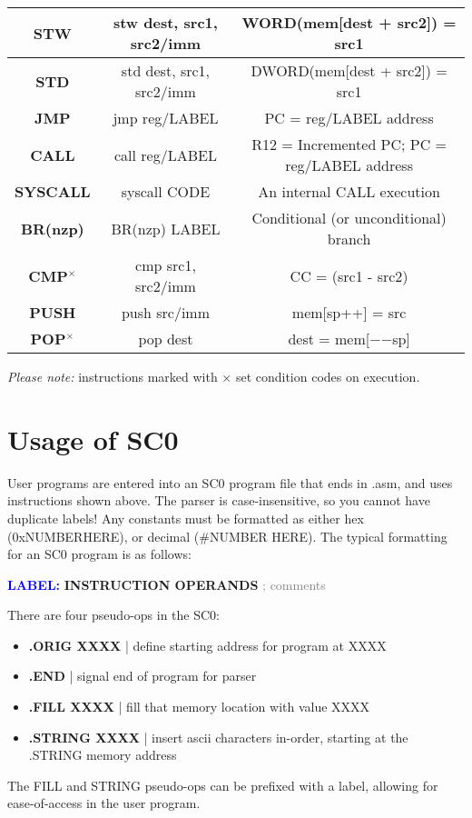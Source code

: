 \documentclass{article}
\newcommand*\scc[1]{{#1}\textbf{$^\times$}}
\begin{document}
\begin{tableofcontents}
\begin{center}
\begin{tabular}{|c|c|c|}
\hline
\textbf{STW} & stw dest, src1, src2/imm & WORD(mem[dest + src2]) = src1 \\
\hline
\textbf{STD} & std dest, src1, src2/imm & DWORD(mem[dest + src2]) = src1 \\
\hline
\textbf{JMP} & jmp reg/LABEL & PC = reg/LABEL address \\
\hline
\textbf{CALL} & call reg/LABEL & R12 = Incremented PC; PC = reg/LABEL address \\
\hline
\textbf{SYSCALL} & syscall CODE & An internal CALL execution \\
\hline
\textbf{BR(nzp)} & BR(nzp) LABEL & Conditional (or unconditional) branch \\
\hline
\textbf{\scc{CMP}} & cmp src1, src2/imm & CC = (src1 - src2) \\
\hline
\textbf{PUSH} & push src/imm & mem[sp++] = src \\
\hline
\textbf{\scc{POP}} & pop dest & dest = mem[$-$$-$sp] \\
\hline
\end{tabular}
\end{center}
\textit{\Large Please note:} instructions marked with $\times$ set condition codes on execution.
\section{\Huge Usage of SC0}
\begin{Large}
User programs are entered into an SC0 program file that ends in .asm, 
and uses instructions shown above. The parser is case-insensitive,
so you cannot have duplicate labels! Any constants must be formatted
as either hex (0xNUMBERHERE), or decimal (\#NUMBER HERE).
The typical formatting for an SC0 program is as follows:
\begin{center}
\textcolor{blue}{\textbf{LABEL:}} \textbf{INSTRUCTION OPERANDS} \textcolor{gray}{; comments}
\end{center}
There are four pseudo-ops in the SC0:
\begin{itemize}
    \item \textbf{.ORIG XXXX} | define starting address for program at XXXX
    \item \textbf{.END} | signal end of program for parser
    \item \textbf{.FILL XXXX} | fill that memory location with value XXXX
    \item \textbf{.STRING XXXX} | insert ascii characters in-order, starting at the .STRING memory address
\end{itemize}
The FILL and STRING pseudo-ops can be prefixed with a label, allowing for ease-of-access
in the user program.


\end{Large}
\end{tableofcontents}
\end{document}
